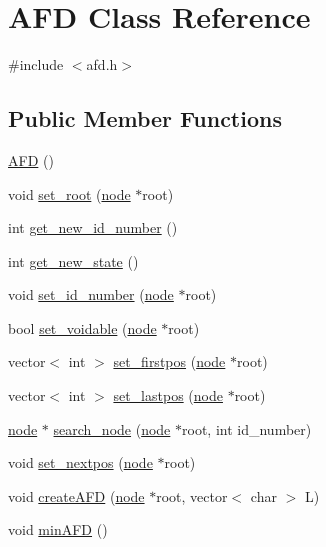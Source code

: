 \hypertarget{class_a_f_d}{}\section{A\+FD Class Reference}
\label{class_a_f_d}


{\ttfamily \#include $<$afd.\+h$>$}

\subsection*{Public Member Functions}
\begin{DoxyCompactItemize}
\item 
\hyperlink{class_a_f_d_a69ad82d0fe1418e4c141649763a585a6}{A\+FD} ()
\item 
void \hyperlink{class_a_f_d_ac2df8498d53da64cef08893ab213db12}{set\+\_\+root} (\hyperlink{structnode}{node} $\ast$root)
\item 
int \hyperlink{class_a_f_d_ae5af7aa0559c41a4857d1b81f66ac3a9}{get\+\_\+new\+\_\+id\+\_\+number} ()
\item 
int \hyperlink{class_a_f_d_adc0b42986b4299eaaeb0c4384e9c0a2d}{get\+\_\+new\+\_\+state} ()
\item 
void \hyperlink{class_a_f_d_a28ca2cf650830a32d1e1716f4a3c4e78}{set\+\_\+id\+\_\+number} (\hyperlink{structnode}{node} $\ast$root)
\item 
bool \hyperlink{class_a_f_d_ab5db119b186c71e653e54d4abc82c068}{set\+\_\+voidable} (\hyperlink{structnode}{node} $\ast$root)
\item 
vector$<$ int $>$ \hyperlink{class_a_f_d_a9d332b7d65be308507b10e7abf0a9d11}{set\+\_\+firstpos} (\hyperlink{structnode}{node} $\ast$root)
\item 
vector$<$ int $>$ \hyperlink{class_a_f_d_a6ebbbeb7971579ee7085730c52ee7dc5}{set\+\_\+lastpos} (\hyperlink{structnode}{node} $\ast$root)
\item 
\hyperlink{structnode}{node} $\ast$ \hyperlink{class_a_f_d_a4dfefc5091e8654160f65db0bc4fc0b0}{search\+\_\+node} (\hyperlink{structnode}{node} $\ast$root, int id\+\_\+number)
\item 
void \hyperlink{class_a_f_d_a2d612d265dfc6864e7563d4e242ef100}{set\+\_\+nextpos} (\hyperlink{structnode}{node} $\ast$root)
\item 
void \hyperlink{class_a_f_d_a9b17ebe33cebd28351196a217b023a0e}{create\+A\+FD} (\hyperlink{structnode}{node} $\ast$root, vector$<$ char $>$ L)
\item 
void \hyperlink{class_a_f_d_a1c7d05c678a6cc4e31c2b4cb93b6408e}{min\+A\+FD} ()

\end{DoxyCompactItemize}
